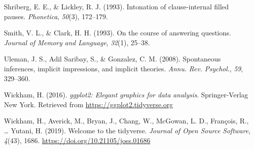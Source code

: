 \documentclass[
  man,floatsintext]{apa6}
\newlength{\cslhangindent}
\newlength{\cslentryspacingunit} %
\newenvironment{CSLReferences}[2] %
 {%
  \setlength{\parindent}{0pt}
  \ifodd #1
  \let\oldpar\par
  \def\par{\hangindent=\cslhangindent\oldpar}
  \fi
  \setlength{\parskip}{#2\cslentryspacingunit}
 }%
 {}
\begin{document}
\begin{CSLReferences}{1}{0}
\leavevmode{}%
Shriberg, E. E., \& Lickley, R. J. (1993). Intonation of clause-internal filled pauses. \emph{Phonetica}, \emph{50}(3), 172--179.

\leavevmode{}%
Smith, V. L., \& Clark, H. H. (1993). On the course of answering questions. \emph{Journal of Memory and Language}, \emph{32}(1), 25--38.

\leavevmode{}%
Uleman, J. S., Adil Saribay, S., \& Gonzalez, C. M. (2008). Spontaneous inferences, implicit impressions, and implicit theories. \emph{Annu. Rev. Psychol.}, \emph{59}, 329--360.

\leavevmode{}%
Wickham, H. (2016). \emph{ggplot2: Elegant graphics for data analysis}. Springer-Verlag New York. Retrieved from \url{https://ggplot2.tidyverse.org}

\leavevmode{}%
Wickham, H., Averick, M., Bryan, J., Chang, W., McGowan, L. D., François, R., \ldots{} Yutani, H. (2019). Welcome to the {tidyverse}. \emph{Journal of Open Source Software}, \emph{4}(43), 1686. \url{https://doi.org/10.21105/joss.01686}

\end{CSLReferences}
\end{document}
